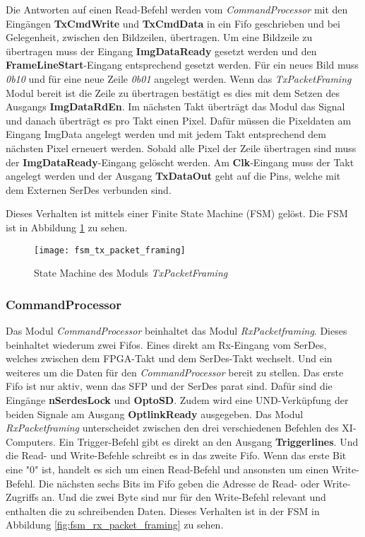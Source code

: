 Die Antworten auf einen Read-Befehl werden vom \textit{CommandProcessor} mit den Eingängen \textbf{TxCmdWrite} und \textbf{TxCmdData} in ein Fifo geschrieben und bei Gelegenheit, zwischen den Bildzeilen, übertragen.
Um eine Bildzeile zu übertragen muss der Eingang \textbf{ImgDataReady} gesetzt werden und den \textbf{FrameLineStart}-Eingang entsprechend gesetzt werden. Für ein neues Bild muss \textit{0b10} und für eine neue Zeile \textit{0b01} angelegt werden. Wenn das \textit{TxPacketFraming} Modul bereit ist die Zeile zu übertragen bestätigt es dies mit dem Setzen des Ausgangs \textbf{ImgDataRdEn}. Im nächsten Takt überträgt das Modul das Signal und danach überträgt es pro Takt einen Pixel. Dafür müssen die Pixeldaten am Eingang {ImgData} angelegt werden und mit jedem Takt entsprechend dem nächsten Pixel erneuert werden. Sobald alle Pixel der Zeile übertragen sind muss der \textbf{ImgDataReady}-Eingang gelöscht werden. Am \textbf{Clk}-Eingang muss der Takt angelegt werden und der Ausgang \textbf{TxDataOut} geht auf die Pins, welche mit dem Externen SerDes verbunden sind.

Dieses Verhalten ist mittels einer Finite State Machine (FSM) gelöst. Die FSM ist in Abbildung \ref{fig:fsm_tx_packet_framing} zu sehen.

\begin{figure}[H]
    \centering
    \texttt{[image: fsm\_tx\_packet\_framing]}
    \caption{State Machine des Moduls \textit{TxPacketFraming}}
    \label{fig:fsm_tx_packet_framing}
\end{figure}

\subsubsection*{CommandProcessor}
Das Modul \textit{CommandProcessor} beinhaltet das Modul \textit{RxPacketframing}. Dieses beinhaltet wiederum zwei Fifos. Eines direkt am Rx-Eingang vom SerDes, welches zwischen dem FPGA-Takt und dem SerDes-Takt wechselt. Und ein weiteres um die Daten für den \textit{CommandProcessor} bereit zu stellen. Das erste Fifo ist nur aktiv, wenn das SFP und der SerDes parat sind. Dafür sind die Eingänge \textbf{nSerdesLock} und \textbf{OptoSD}. Zudem wird eine UND-Verküpfung der beiden Signale am Ausgang \textbf{OptlinkReady} ausgegeben. Das Modul \textit{RxPacketframing} unterscheidet zwischen den drei verschiedenen Befehlen des XI-Computers. Ein Trigger-Befehl gibt es direkt an den Ausgang \textbf{Triggerlines}. Und die Read- und Write-Befehle schreibt es in das zweite Fifo. Wenn das erste Bit eine "0" ist, handelt es sich um einen Read-Befehl und ansonsten um einen Write-Befehl. Die nächsten sechs Bits im Fifo geben die Adresse de Read- oder Write-Zugriffs an. Und die zwei Byte sind nur für den Write-Befehl relevant und enthalten die zu schreibenden Daten. Dieses Verhalten ist in der FSM in Abbildung \ref{fig:fsm_rx_packet_framing} zu sehen.

